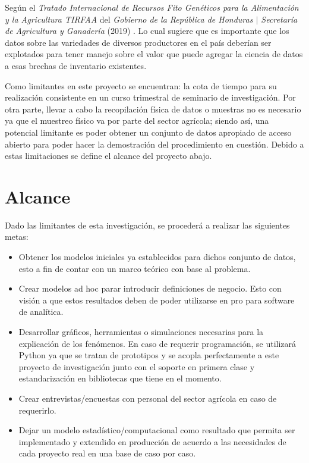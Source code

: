 \documentclass{report}
\begin{document}
\bigbreak

Según el \textit{Tratado Internacional de  Recursos Fito Genéticos  para la Alimentación y la Agricultura  TIRFAA} del \textit{Gobierno de la República de Honduras $\mid$ Secretaría de Agricultura y Ganadería} (2019) \cite{santacreo-2019} . Lo cual sugiere que es importante que los datos sobre las variedades de diversos productores en el país deberían ser explotados para tener manejo sobre el valor que puede agregar la ciencia de datos a esas brechas de inventario existentes.

\bigbreak

Como limitantes en este proyecto se encuentran: la cota de tiempo para su realización consistente en un curso trimestral de seminario de investigación. Por otra parte, llevar a cabo la recopilación física de datos o muestras no es necesario ya que el muestreo físico va por parte del sector agrícola; siendo así, una potencial limitante es poder obtener un conjunto de datos apropiado de acceso abierto para poder hacer la demostración del procedimiento en cuestión. Debido a estas limitaciones se define el alcance del proyecto abajo.

\section{Alcance}

Dado las limitantes de esta investigación, se procederá a realizar las siguientes metas:

\begin{itemize}
    \item Obtener los modelos iniciales ya establecidos para dichos conjunto de datos, esto a fin de contar con un marco teórico con base al problema.
    
    \item Crear modelos ad hoc parar introducir definiciones de negocio. Esto con visión a que estos resultados deben de poder utilizarse en pro para software de analítica.
    
    \item Desarrollar gráficos, herramientas o simulaciones necesarias para la explicación de los fenómenos. En caso de requerir programación, se utilizará Python ya que se tratan de prototipos y se acopla perfectamente a este proyecto de investigación junto con el soporte en primera clase y estandarización en bibliotecas que tiene en el momento.
    
    \item Crear entrevistas/encuestas con personal del sector agrícola en caso de requerirlo.
    
    \item Dejar un modelo estadístico/computacional como resultado que permita ser implementado y extendido en producción de acuerdo a las necesidades de cada proyecto real en una base de caso por caso.
\end{itemize}
\end{document}
